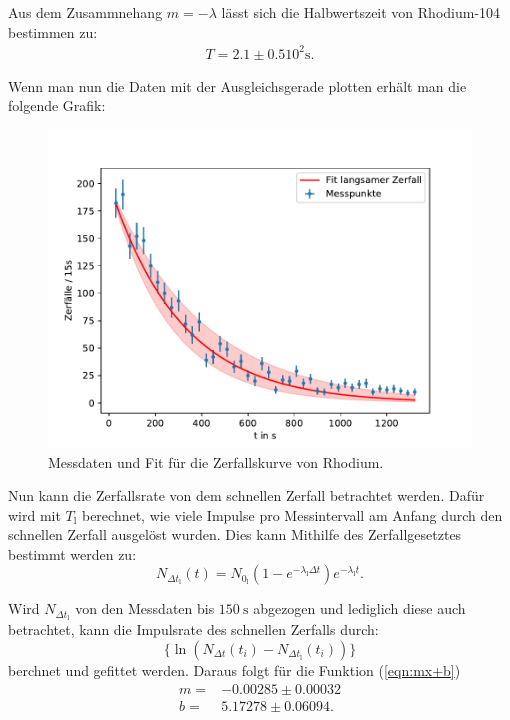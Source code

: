 Aus dem Zusammnehang $m = -\lambda$ lässt sich die Halbwertszeit von Rhodium-104 bestimmen zu:
\begin{align*}
	T = 2.1\pm0.5 10^{2} \si{\second}.
\end{align*}

Wenn man nun die Daten mit der Ausgleichsgerade plotten erhält man die folgende Grafik:
\begin{figure}[H]
	\centering
	\includegraphics{Daten/Rhodium.pdf}
	\caption{Messdaten und Fit für die Zerfallskurve von Rhodium.}
	\label{fig:zerfallskurve}
\end{figure}
\noindent
\newpage
Nun kann die Zerfallsrate von dem schnellen Zerfall betrachtet werden. Dafür wird mit $T_\text{l}$ berechnet, wie viele Impulse pro Messintervall am Anfang durch den schnellen Zerfall ausgelöst wurden.
Dies kann Mithilfe des Zerfallgesetztes bestimmt werden zu:
\begin{equation}
	N_{\Delta t_\text{l}} (t) = N_{0_\text{l}} \left(1 - e^{-\lambda_\text{l}\Delta t}\right) 
	e^{-\lambda_\text{l}t }.
\end{equation}
\noindent

Wird $N_{\Delta t_\text{l}}$ von den Messdaten bis $\SI{150}{\second}$ abgezogen und lediglich diese auch betrachtet, kann die Impulsrate des schnellen Zerfalls durch:
\begin{equation*}
	\{ \ln(N_{\Delta t}(t_i) - N_{\Delta t_\text{l}} (t_i)) \}
\end{equation*}
berchnet und gefittet werden. Daraus folgt für die Funktion (\ref{eqn:mx+b})
\begin{align*}
    m =& -0.00285 \pm 0.00032 \\
    b =& 5.17278 \pm  0.06094.
\end{align*}
\noindent

